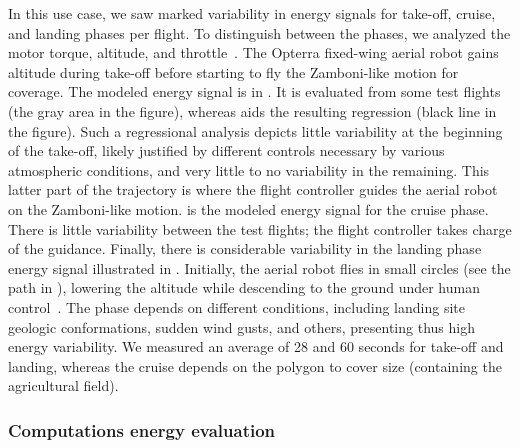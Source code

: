 In this use case, we saw marked variability in energy signals for take-off, cruise, and landing phases per flight. To distinguish between the phases, we analyzed the motor torque, altitude, and throttle~\citep{seewald2020mechanical}. The Opterra fixed-wing aerial robot gains altitude during take-off before starting to fly the Zamboni-like motion for coverage. The modeled energy signal is in . It is evaluated from some test flights (the gray area in the figure), whereas \matlab aids the resulting regression (black line in the figure). Such a regressional analysis depicts little variability at the beginning of the take-off, likely justified by different controls necessary by various atmospheric conditions, and very little to no variability in the remaining. This latter part of the trajectory is where the flight controller guides the aerial robot on the Zamboni-like motion.  is the modeled energy signal for the cruise phase. There is little variability between the test flights; the flight controller takes charge of the guidance. Finally, there is considerable variability in the landing phase energy signal illustrated in . Initially, the aerial robot flies in small circles (see the path in ), lowering the altitude while descending to the ground under human control~\citep{seewald2020mechanical}. The phase depends on different conditions, including landing site geologic conformations, sudden wind gusts, and others, presenting thus high energy variability. We measured an average of 28 and 60 seconds for take-off and landing, whereas the cruise depends on the polygon to cover size (containing the agricultural field).

\subsubsection{Computations energy evaluation}

